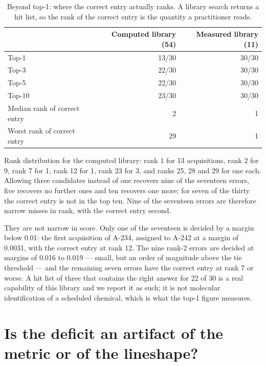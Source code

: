 \documentclass[11pt]{article}
\begin{document}
\begin{table}[htbp]
\centering
\caption{Beyond top-1: where the correct entry actually ranks. A library search returns a
hit list, so the rank of the correct entry is the quantity a practitioner reads.}
\label{tab:si-topk}
\small
\begin{tabular}{lrr}
\toprule
 & Computed library (54) & Measured library (11) \\
\midrule
Top-1 & 13/30 & 30/30 \\
Top-3 & 22/30 & 30/30 \\
Top-5 & 22/30 & 30/30 \\
Top-10 & 23/30 & 30/30 \\
\midrule
Median rank of correct entry & 2 & 1 \\
Worst rank of correct entry & 29 & 1 \\
\bottomrule
\end{tabular}

\begin{flushleft}\footnotesize Rank distribution for the computed library: rank 1 for 13
acquisitions, rank 2 for 9, rank 7 for 1, rank 12 for 1, rank 23 for 3, and ranks 25, 28
and 29 for one each. Allowing three candidates instead of one recovers nine of the
seventeen errors, five recovers no further ones and ten recovers one more; for seven of
the thirty the correct entry is not in the top ten. Nine of the seventeen errors are
therefore narrow misses in rank, with the correct entry second.

They are not narrow in score. Only one of the seventeen is decided by a margin below
0.01: the first acquisition of A-234, assigned to A-242 at a margin of 0.0031, with the
correct entry at rank 12. The nine rank-2 errors are decided at margins of 0.016 to 0.019
--- small, but an order of magnitude above the tie threshold --- and the remaining
seven errors have the correct entry at rank 7 or worse. A hit list of three that
contains the right answer for 22 of 30 is a real capability of this library and we report
it as such; it is not molecular identification of a scheduled chemical, which is what the
top-1 figure measures.\end{flushleft}
\end{table}

\section{Is the deficit an artifact of the metric or of the lineshape?}
\label{si:metric}
\end{document}
